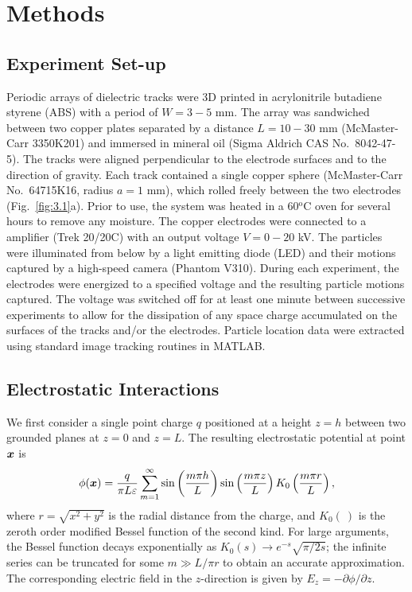 \section{Methods}

\subsection{Experiment Set-up} 
Periodic arrays of dielectric tracks were 3D printed in acrylonitrile butadiene styrene (ABS) with a period of $W=3-5$ mm. The array was sandwiched between two copper plates separated by a distance $L=10-30$ mm (McMaster-Carr 3350K201) and immersed in mineral oil (Sigma Aldrich CAS No.~8042-47-5). The tracks were aligned perpendicular to the electrode surfaces and to the direction of gravity. Each track contained a single copper sphere (McMaster-Carr No.~64715K16, radius $a=1$ mm), which rolled freely between the two electrodes (Fig.~\ref{fig:3.1}a). Prior to use, the system was heated in a 60$^\text{o}$C oven for several hours to remove any moisture. The copper electrodes were connected to a amplifier (Trek 20/20C) with an output voltage $V=0-20$ kV.  The particles were illuminated from below by a light emitting diode (LED) and their motions captured by a high-speed camera (Phantom V310).  During each experiment, the electrodes were energized to a specified voltage and the resulting particle motions captured. The voltage was switched off for at least one minute between successive experiments to allow for the dissipation of any space charge accumulated on the surfaces of the tracks and/or the electrodes.  Particle location data were extracted using standard image tracking routines in MATLAB.




\subsection{Electrostatic Interactions}
We first consider a single point charge $q$ positioned at a height $z=h$ between two grounded planes at $z=0$ and $z=L$.  The resulting electrostatic potential at point $\boldsymbol{x}$ is 
\begin{equation}
    \phi(\boldsymbol{x}) = \frac{q}{\pi L \varepsilon} \sum_{m=1}^{\infty} \sin\left(\frac{m\pi h}{L}\right)  \sin\left(\frac{m\pi z}{L}\right) K_0\left(\frac{m \pi r}{L}\right),\label{eq:point}
\end{equation}
where $r=\sqrt{x^2 + y^2}$ is the radial distance from the charge, and $K_0(~)$ is the zeroth order modified Bessel function of the second kind. For large arguments, the Bessel function decays exponentially as $K_0(s)\rightarrow e^{-s}\sqrt{\pi/2 s} $; the infinite series can be truncated for some $m\gg L/\pi r$ to obtain an accurate approximation.  The corresponding electric field in the $z$-direction is given by $E_z = -\partial \phi / \partial z$. 

